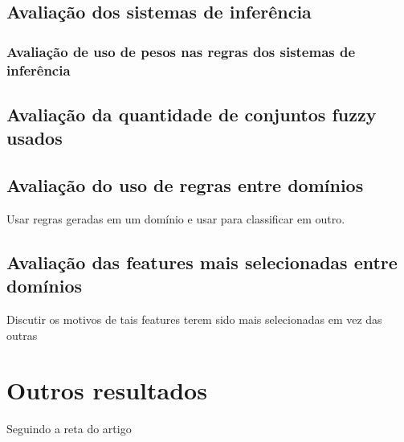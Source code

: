 \subsection{Avaliação dos sistemas de inferência}



\subsubsection{Avaliação de uso de pesos nas regras dos sistemas de inferência}

\subsection{Avaliação da quantidade de conjuntos fuzzy usados}

\subsection{Avaliação do uso de regras entre domínios}

Usar regras geradas em um domínio e usar para classificar em outro.

\subsection{Avaliação das features mais selecionadas entre domínios}

Discutir os motivos de tais features terem sido mais selecionadas em vez das outras

\section{Outros resultados}

Seguindo a reta do artigo
